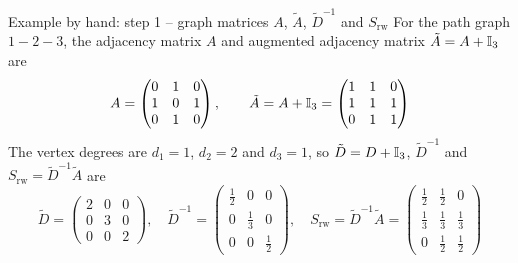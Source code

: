 \documentclass[aspectratio=169]{beamer}\usepackage[]{graphicx}\usepackage[]{xcolor}
\begin{document}
\begin{frame}{Example by hand: step 1 -- graph matrices $A$, $\tilde{A}$, $\tilde{D}^{-1}$ and $S_{\text{rw}}$}
For the path graph $1 - 2 - 3$, the adjacency matrix $A$ and augmented adjacency matrix $\tilde{A} = A + \mathbb{I}_3$ are
\[
A = \begin{pmatrix} 0 & 1 & 0 \\ 1 & 0 & 1 \\ 0 & 1 & 0 \end{pmatrix}, \qquad
\tilde{A} = A + \mathbb{I}_3 = \begin{pmatrix} 1 & 1 & 0 \\ 1 & 1 & 1 \\ 0 & 1 & 1 \end{pmatrix}
\]
\vfill
The vertex degrees are $d_1 = 1$, $d_2 = 2$ and $d_3 = 1$, so $\tilde{D} = D + \mathbb{I}_3$, $\tilde{D}^{-1}$ and $S_{\text{rw}} = \tilde{D}^{-1}\tilde{A}$ are
\[
\tilde{D} = \begin{pmatrix} 2 & 0 & 0 \\ 0 & 3 & 0 \\ 0 & 0 & 2 \end{pmatrix}, \quad
\tilde{D}^{-1} = \begin{pmatrix} \frac{1}{2} & 0 & 0 \\ 0 & \frac{1}{3} & 0 \\ 0 & 0 & \frac{1}{2} \end{pmatrix}, \quad
S_{\text{rw}} = \tilde{D}^{-1}\tilde{A} =
\begin{pmatrix}
\frac{1}{2} & \frac{1}{2} & 0 \\[2pt]
\frac{1}{3} & \frac{1}{3} & \frac{1}{3} \\[2pt]
0 & \frac{1}{2} & \frac{1}{2}
\end{pmatrix}
\]
\end{frame}
\end{document}
